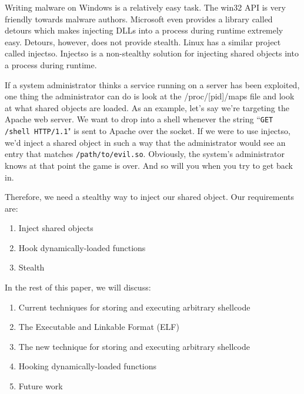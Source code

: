 Writing malware on Windows is a relatively easy task. The win32 API is very friendly
towards malware authors. Microsoft even provides a library called detours which makes
injecting DLLs into a process during runtime extremely easy. Detours, however, does
not provide stealth. Linux has a similar project called injectso. Injectso is a
non-stealthy solution for injecting shared objects into a process during runtime.

If a system administrator thinks a service running on a server has been exploited,
one thing the administrator can do is look at the /proc/[pid]/maps file and look
at what shared objects are loaded. As an example, let's say we're targeting the
Apache web server. We want to drop into a shell whenever the string
``\texttt{GET /shell HTTP/1.1}" is sent to Apache over the socket. If we were to
use injectso, we'd inject a shared object in such a way that the administrator
would see an entry that matches \texttt{/path/to/evil.so}. Obviously, the system's
administrator knows at that point the game is over. And so will you when you try
to get back in.

Therefore, we need a stealthy way to inject our shared object. Our requirements are:
\begin{enumerate}
\item{Inject shared objects}
\item{Hook dynamically-loaded functions}
\item{Stealth}
\end{enumerate}

In the rest of this paper, we will discuss:
\begin{enumerate}
\item{Current techniques for storing and executing arbitrary shellcode}
\item{The Executable and Linkable Format (ELF)}
\item{The new technique for storing and executing arbitrary shellcode}
\item{Hooking dynamically-loaded functions}
\item{Future work}
\end{enumerate}
